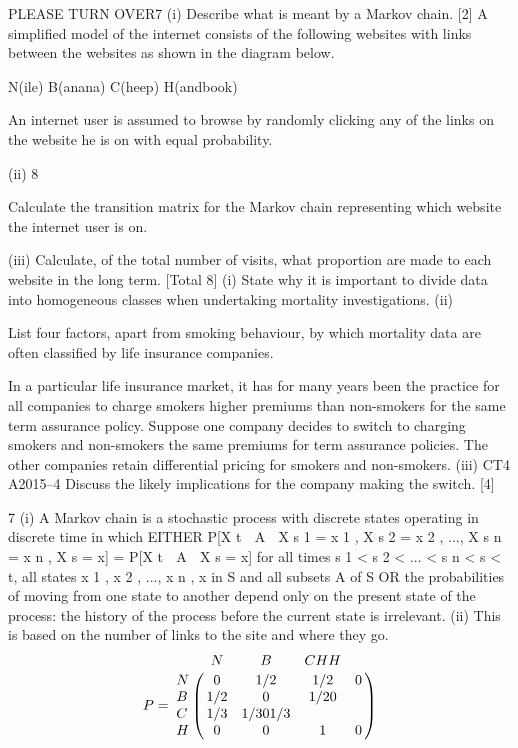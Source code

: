 \documentclass[a4paper,12pt]{article}
\begin{document}
\begin{enumerate}
PLEASE TURN OVER7
(i)
Describe what is meant by a Markov chain.
[2]
A simplified model of the internet consists of the following websites with links between the websites as shown in the diagram below.

N(ile) B(anana)
C(heep) H(andbook)

An internet user is assumed to browse by randomly clicking any of the links on the website he is on with equal probability.

(ii)
8

Calculate the transition matrix for the Markov chain representing which
website the internet user is on.

(iii) Calculate, of the total number of visits, what proportion are made to each
website in the long term.
[Total 8]
(i) State why it is important to divide data into homogeneous classes when
undertaking mortality investigations.
(ii)

List four factors, apart from smoking behaviour, by which mortality data are
often classified by life insurance companies.

In a particular life insurance market, it has for many years been the practice for all companies to charge smokers higher premiums than non-smokers for the same term assurance policy. Suppose one company decides to switch to charging smokers and
non-smokers the same premiums for term assurance policies. The other companies
retain differential pricing for smokers and non-smokers.
(iii)
CT4 A2015–4
Discuss the likely implications for the company making the switch.
[4]



7
(i)
A Markov chain is a stochastic process with discrete states operating in
discrete time in which
EITHER
P[X t  A  X s 1 = x 1 , X s 2 = x 2 , ..., X s n = x n , X s = x] = P[X t  A  X s = x]
for all times s 1 < s 2 < ... < s n < s < t, all states x 1 , x 2 , ..., x n , x in S and all
subsets A of S
OR
the probabilities of moving from one state to another depend only on the
present state of the process: the history of the process before the current state
is irrelevant.
(ii)
This is based on the number of links to the site and where they go.
\[P = \bordermatrix{

  & N & B & C H H \cr
N  & 0 & 1/2 & 1/2 & 0 \cr
B  & 1/2 & 0 &1/2 0 \cr
C  & 1/3 & 1/3 0 1/3 \cr
H  & 0 & 0 & 1 & 0 \cr
}\]


\end{enumerate}
\end{document}
